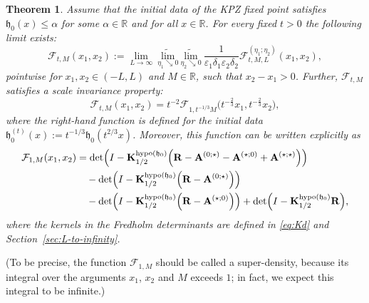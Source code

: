 \documentclass[oneside,final,11pt]{amsart}
\newtheorem{thm}{Theorem}[section]
\theoremstyle{definition}
\newcommand{\fh}{\mathfrak{h}}
\newcommand{\mylim}[1]{\underset{#1}{\wt{\mathrm{lim}}}}
\newcommand{\R}{\mathbb{R}}
\newcommand{\dens}{\CF}
\newcommand{\1}[1]{\mathbf{1}_{#1}}
\newcommand{\eps}{\varepsilon}
\newcommand{\wt}{\widetilde}
\newcommand{\blue}[1]{{\color{blue}#1}}
\newcommand{\red}[1]{{\color{red}#1}}
\newcommand{\uptext}[1]{\text{\upshape{#1}}}
\DeclareMathOperator{\hypo}{\uptext{hypo}}
\newcommand{\fA}{\mathbf{A}}
\newcommand{\fK}{\mathbf{K}}
\newcommand{\fR}{\mathbf{R}}
\newcommand{\CF}{\mathcal{F}}
\numberwithin{equation}{section}
\begin{document}
\begin{thm}\label{thm:densities}
Assume that the initial data of the KPZ fixed point satisfies $\fh_0(x) \leq \alpha$ for some $\alpha\in \mathbb{R}$ and for all $x \in \R$. For every fixed $t > 0$ the  following limit exists: %
\begin{equation}\label{eq:F-limit}
	\dens_{t, M}(x_1, x_2) := %
    \lim_{L \to \infty}\ \mylim{\eta_1 \searrow 0}\ \mylim{\eta_2 \searrow 0}\ \frac{1}{\eps_1 \delta_1 \eps_2 \delta_2} \dens^{(\eta_1; \eta_2)}_{t, M, L}(x_1, x_2),
\end{equation}
pointwise for $x_1, x_2 \in (-L, L)$ and $M \in \R$, such that $x_2 - x_1 > 0$.
%
Further, $\dens_{t,M}$ satisfies a scale invariance property:
%
\begin{equation}
\dens_{t, M}(x_1, x_2) = t^{-2} \dens_{1, t^{-1/3} M} \bigl(t^{-\frac{2}{3}} x_1, t^{-\frac{2}{3}} x_2\bigr),
\end{equation}
%
where the right-hand function is defined for the initial data $\fh_0^{(t)}(x) := t^{-1/3}\fh_0(t^{2/3} x)$. Moreover, this function can be written explicitly as
% 
\begin{equation}
\begin{split}
\dens_{1, M}(x_1, x_2) &= \det\Bigl(I- \fK^{\hypo(\fh_0)}_{1/2} \Bigl(\fR - \fA^{(0; \star)} - \fA^{(\star; 0)} + \fA^{(\star; \star)}\Bigr) \Bigr) \\
&\quad - \det\Bigl(I- \fK^{\hypo(\fh_0)}_{1/2} \Bigl(\fR - \fA^{(0; \star)}\Bigr) \Bigr)\\
&\quad - \det \Bigl(I- \fK^{\hypo(\fh_0)}_{1/2} \Bigl(\fR - \fA^{(\star; 0)}\Bigr) \Bigr) + \det \Bigl(I-\fK^{\hypo(\fh_0)}_{1/2}\fR\Bigr),
\end{split}
\end{equation}
%
where the kernels in the Fredholm determinants are defined in \eqref{eq:Kd} and Section~\ref{sec:L-to-infinity}.
\end{thm}



(To be precise, the function $\dens_{1,M}$ should be called a super-density, because its integral over the arguments $x_1$, $x_2$ and $M$ exceeds $1$; in fact, we expect this integral to be infinite.) 
\end{document}
